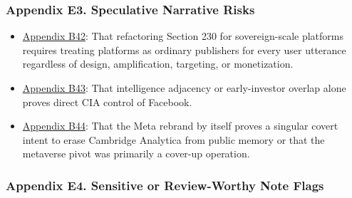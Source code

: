\documentclass[
  american,
  11pt,
  letterpaper,
]{article}
\providecommand{\tightlist}{%
  \setlength{\itemsep}{0pt}\setlength{\parskip}{0pt}}
\begin{document}
\subsubsection{Appendix E3. Speculative Narrative
Risks}\label{ch-01-appendix-e3-speculative-narrative-risks}

\begin{itemize}
\tightlist
\item
  \hyperref[ch-01-appendix-b42-refactoring-section-230-for-sovereign-scale-platforms-requires-treating-platforms]{Appendix
  B42}: That refactoring Section 230 for sovereign-scale platforms
  requires treating platforms as ordinary publishers for every user
  utterance regardless of design, amplification, targeting, or
  monetization.
\item
  \hyperref[ch-01-appendix-b43-intelligence-adjacency-or-early-investor-overlap-alone-proves-direct-cia-control]{Appendix
  B43}: That intelligence adjacency or early-investor overlap alone
  proves direct CIA control of Facebook.
\item
  \hyperref[ch-01-appendix-b44-the-meta-rebrand-by-itself-proves-a-singular-covert-intent-to-erase-cambridge-ana]{Appendix
  B44}: That the Meta rebrand by itself proves a singular covert intent
  to erase Cambridge Analytica from public memory or that the metaverse
  pivot was primarily a cover-up operation.
\end{itemize}

\subsubsection{Appendix E4. Sensitive or Review-Worthy Note
Flags}\label{ch-01-appendix-e4-sensitive-or-review-worthy-note-flags}
\end{document}
